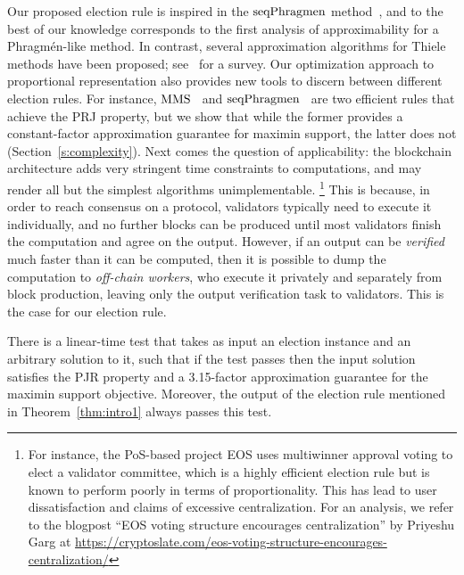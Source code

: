 Our proposed election rule is inspired in the $\operatorname{seqPhragmen}$ method~\cite{brill2017phragmen}, and to the best of our knowledge corresponds to the first analysis of approximability for a Phragm\'{e}n-like method. 
In contrast, several approximation algorithms for Thiele methods have been proposed; see~\cite{lackner2020approval} for a survey. 
%
Our optimization approach to proportional representation also provides new tools to discern between different election rules. For instance, $\operatorname{MMS}$~\cite{sanchez2016maximin} and $\operatorname{seqPhragmen}$~\cite{brill2017phragmen} are two efficient rules that achieve the PRJ property, but we show that while the former provides a constant-factor approximation guarantee for maximin support, the latter does not (Section~\ref{s:complexity}). 
%
Next comes the question of applicability: the blockchain architecture adds very stringent time constraints to computations, and may render all but the simplest algorithms unimplementable.%
%
\footnote{For instance, the PoS-based project EOS uses multiwinner approval voting to elect a validator committee, which is a highly efficient election rule but is known to perform poorly in terms of proportionality. This has lead to user dissatisfaction and claims of excessive centralization. 
For an analysis, we refer to the blogpost ``EOS voting structure encourages centralization'' by Priyeshu Garg at \url{https://cryptoslate.com/eos-voting-structure-encourages-centralization/}} %
% 
This is because, in order to reach consensus on a protocol, validators typically need to execute it individually, and no further blocks can be produced until most validators finish the computation and agree on the output. 
However, if an output can be \emph{verified} much faster than it can be computed, then it is possible to dump the computation to \emph{off-chain workers}, who execute it privately and separately from block production, leaving only the output verification task to validators. This is the case for our election rule.

\begin{theorem}\label{thm:intro2}
There is a linear-time test that takes as input an election instance and an arbitrary solution to it, such that if the test passes then the input solution satisfies the PJR property and a 3.15-factor approximation guarantee for the maximin support objective. 
Moreover, the output of the election rule mentioned in Theorem~\ref{thm:intro1} always passes this test.
\end{theorem}

